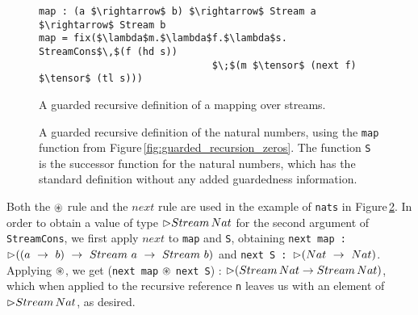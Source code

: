 \begin{figure}
\begin{lstlisting}[mathescape]
map : (a $\rightarrow$ b) $\rightarrow$ Stream a $\rightarrow$ Stream b
map = fix($\lambda$m.$\lambda$f.$\lambda$s. StreamCons$\,$(f (hd s)) 
                              $\;$(m $\tensor$ (next f) $\tensor$ (tl s)))
\end{lstlisting}
\caption{A guarded recursive definition of a mapping over streams.}
\label{fig:guarded_recursion_map}
\end{figure}

\begin{figure}

\caption{A guarded recursive definition of the natural numbers, using the \texttt{map} function from Figure\,\ref{fig:guarded_recursion_zeros}. The function \texttt{S} is the successor function for the natural numbers, which has the standard definition without any added guardedness information.}
\label{fig:guarded_recursion_nats}
\end{figure}

Both the $\circledast$ rule and the $next$ rule are used in the example of \texttt{nats} in Figure\,\ref{fig:guarded_recursion_nats}. In order to obtain a value of type $\rhd Stream\,Nat$ for the second argument of \texttt{StreamCons}, we first apply $next$ to \texttt{map} and \texttt{S}, obtaining \texttt{next map :} $\rhd((a~\rightarrow~b)~\rightarrow~Stream~a~\rightarrow~Stream~b)$ and \texttt{next~S~:}~$\rhd(Nat~\rightarrow~Nat)$. Applying $\circledast$, we get (\texttt{next map} $\circledast$ \texttt{next S}) : $\rhd(Stream\,Nat \rightarrow Stream\,Nat)$, which when applied to the recursive reference \texttt{n} leaves us with an element of $\rhd Stream\,Nat$, as desired.

